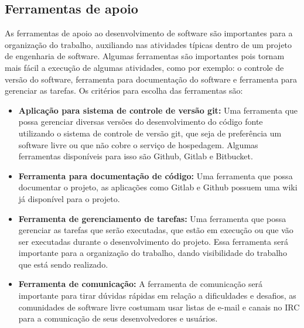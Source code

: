 \subsection{Ferramentas de apoio}

As ferramentas de apoio ao desenvolvimento de software são importantes para a
organização do trabalho, auxiliando nas atividades típicas dentro de um projeto
de engenharia de software. Algumas ferramentas são importantes pois tornam mais fácil
a execução de algumas atividades, como por exemplo: o controle de versão do software,
ferramenta para documentação do software e ferramenta para gerenciar as tarefas.
Os critérios para escolha das ferramentas são:

\begin{itemize}
  \item \textbf{Aplicação para sistema de controle de versão git:} Uma ferramenta que
  possa gerenciar diversas versões do desenvolvimento do código fonte utilizando
  o sistema de controle de versão git, que seja de preferência um software livre
  ou que não cobre o serviço de hospedagem. Algumas ferramentas disponíveis para
  isso são Github, Gitlab e Bitbucket.
  \item \textbf{Ferramenta para documentação de código:} Uma ferramenta que possa
  documentar o projeto, as aplicações como Gitlab e Github possuem uma wiki já disponível
  para o projeto.
  \item \textbf{Ferramenta de gerenciamento de tarefas:} Uma ferramenta que possa
  gerenciar as tarefas que serão executadas, que estão em execução ou que vão ser executadas
  durante o desenvolvimento do projeto. Essa ferramenta será importante para a
  organização do trabalho, dando visibilidade do trabalho que está sendo realizado.
  \item \textbf{Ferramenta de comunicação:} A ferramenta de comunicação será
  importante para tirar dúvidas rápidas em relação a dificuldades e desafios, as
  comunidades de software livre costumam usar listas de e-mail e canais no IRC
  para a comunicação de seus desenvolvedores e usuários.
\end{itemize}

